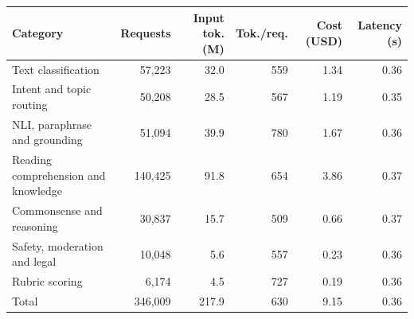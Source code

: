 \begin{tabular}{l r r r r r}
    \toprule
    Category & Requests & Input tok. (M) & Tok./req. & Cost (USD) & Latency (s) \\
    \midrule
    Text classification & 57{,}223 & 32.0 & 559 & 1.34 & 0.36 \\
    \rowcolor{gray!10}Intent and topic routing & 50{,}208 & 28.5 & 567 & 1.19 & 0.35 \\
    NLI, paraphrase and grounding & 51{,}094 & 39.9 & 780 & 1.67 & 0.36 \\
    \rowcolor{gray!10}Reading comprehension and knowledge & 140{,}425 & 91.8 & 654 & 3.86 & 0.37 \\
    Commonsense and reasoning & 30{,}837 & 15.7 & 509 & 0.66 & 0.37 \\
    \rowcolor{gray!10}Safety, moderation and legal & 10{,}048 & 5.6 & 557 & 0.23 & 0.36 \\
    Rubric scoring & 6{,}174 & 4.5 & 727 & 0.19 & 0.36 \\
    \midrule
    Total & 346{,}009 & 217.9 & 630 & 9.15 & 0.36 \\
    \bottomrule
\end{tabular}
